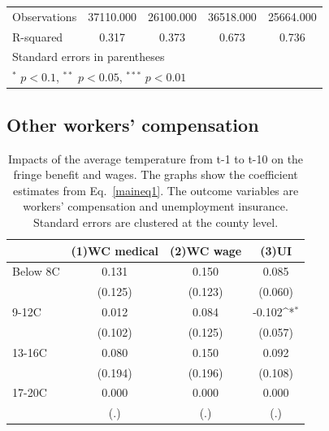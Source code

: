 \documentclass[12pt]{article}
\newcommand{\sym}[1]{\ensuremath{^{#1}}}
\begin{document}
\begin{appendices}
\begin{table}[h!]
\begin{tabular}{l*{4}{c}}
Observations        &   37110.000         &   26100.000         &   36518.000         &   25664.000         \\
R-squared           &       0.317         &       0.373         &       0.673         &       0.736         \\
\hline\hline
\multicolumn{5}{l}{\footnotesize Standard errors in parentheses}\\
\multicolumn{5}{l}{\footnotesize \sym{*} \(p<0.1\), \sym{**} \(p<0.05\), \sym{***} \(p<0.01\)}\\
\end{tabular}
\end{table}



\clearpage
\subsection{Other workers' compensation}
\begin{table}[h!]
\caption{Impacts of the average temperature from t-1 to t-10 on the fringe benefit and wages. The graphs show the coefficient estimates from Eq.~\ref{maineq1}. The outcome variables are workers' compensation and unemployment insurance. Standard errors are clustered at the county level.}
\footnotesize
\centering
\def\sym#1{\ifmmode^{#1}\else\(^{#1}\)\fi}
\begin{tabular}{l*{3}{c}}
\hline\hline
                    &\multicolumn{1}{c}{(1)WC medical}&\multicolumn{1}{c}{(2)WC wage}&\multicolumn{1}{c}{(3)UI}\\
\hline
Below 8C            &       0.131         &       0.150         &       0.085         \\
                    &     (0.125)         &     (0.123)         &     (0.060)         \\
9-12C               &       0.012         &       0.084         &      -0.102\sym{*}  \\
                    &     (0.102)         &     (0.125)         &     (0.057)         \\
13-16C              &       0.080         &       0.150         &       0.092         \\
                    &     (0.194)         &     (0.196)         &     (0.108)         \\
17-20C              &       0.000         &       0.000         &       0.000         \\
                    &         (.)         &         (.)         &         (.)         \\

\end{tabular}
\end{table}
\end{appendices}
\end{document}
